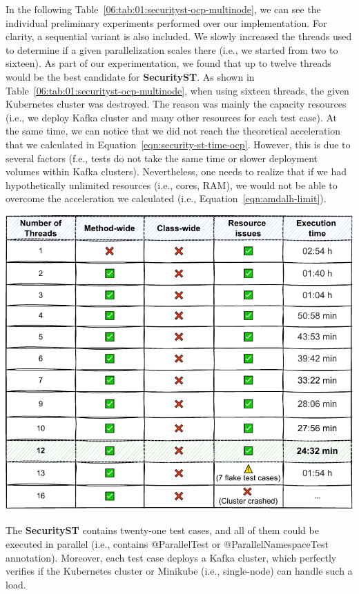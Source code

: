 In the following Table~\ref{06:tab:01:securityst-ocp-multinode}, we can see the individual preliminary experiments performed over our implementation.
For clarity, a sequential variant is also included.
We slowly increased the threads used to determine if a given parallelization scales there (i.e., we started from two to sixteen).
As part of our experimentation, we found that up to twelve threads would be the best candidate for \textbf{SecurityST}.
As shown in Table~\ref{06:tab:01:securityst-ocp-multinode}, when using sixteen threads, the given Kubernetes cluster was destroyed.
The reason was mainly the capacity resources (i.e., we deploy Kafka cluster and many other resources for each test case).
At the same time, we can notice that we did not reach the theoretical acceleration that we calculated in Equation~\eqref{eqn:security-st-time-ocp}.
However, this is due to several factors (f.e., tests do not take the same time or slower deployment volumes within Kafka clusters).
Nevertheless, one needs to realize that if we had hypothetically unlimited resources (i.e., cores, RAM), we would not be able to overcome
the acceleration we calculated (i.e., Equation~\eqref{eqn:amdalh-limit}).
\begin{table}[ht!]
    \centering
    \includegraphics[scale=0.8]{obrazky-figures/08-experiments/preliminary/06-exp-final-smoke-method-wide-ocp}
    \caption{The \textbf{SecurityST} contains twenty-one test cases, and all of them could be executed in parallel
        (i.e., contains @ParallelTest or @ParallelNamespaceTest annotation).
        Moreover, each test case deploys a Kafka cluster, which perfectly verifies if the Kubernetes cluster
        or Minikube (i.e., single-node) can handle such a load.}
    \label{06:tab:01:securityst-ocp-multinode}
\end{table}

